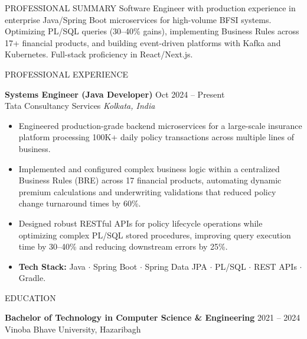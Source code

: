\documentclass{resume} %
\begin{document}
\begin{rSection}{PROFESSIONAL SUMMARY}
    \vspace{-0.5em}
    Software Engineer with production experience in enterprise Java/Spring Boot microservices for high-volume BFSI systems. Optimizing PL/SQL queries (30--40\% gains), implementing Business Rules across 17+ financial products, and building event-driven platforms with Kafka and Kubernetes. Full-stack proficiency in React/Next.js.
\end{rSection}

\begin{rSection}{PROFESSIONAL EXPERIENCE}

    \textbf{Systems Engineer (Java Developer)} \hfill Oct 2024 -- Present\\
    Tata Consultancy Services \hfill \textit{Kolkata, India}
    \begin{itemize}
        \itemsep -3pt
        \item Engineered production-grade backend microservices for a large-scale insurance
              platform processing 100K+ daily policy transactions across multiple lines of
              business.
        \item Implemented and configured complex business logic within a centralized Business
              Rules (BRE) across 17 financial products, automating dynamic premium
              calculations and underwriting validations that reduced policy change turnaround
              times by 60\%.
        \item Designed robust RESTful APIs for policy lifecycle operations while optimizing
              complex PL/SQL stored procedures, improving query execution time by 30--40\%
              and reducing downstream errors by 25\%.
        \item \textbf{Tech Stack:} Java $\cdot$ Spring Boot $\cdot$ Spring Data JPA $\cdot$ PL/SQL $\cdot$ REST APIs $\cdot$ Gradle.
    \end{itemize}

\end{rSection}

\begin{rSection}{EDUCATION}

    {\bf Bachelor of Technology in Computer Science \& Engineering} \hfill {2021 -- 2024}\\
    Vinoba Bhave University, Hazaribagh

\end{rSection}
\end{document}
